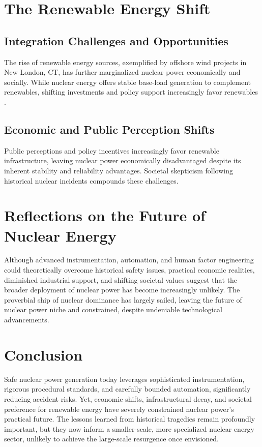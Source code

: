 \documentclass[12pt]{article}
\begin{document}
\section{The Renewable Energy Shift}

\subsection{Integration Challenges and Opportunities}
The rise of renewable energy sources, exemplified by offshore wind projects in New London, CT, has further marginalized nuclear power economically and socially. While nuclear energy offers stable base-load generation to complement renewables, shifting investments and policy support increasingly favor renewables \cite{abdussami2025future}.

\subsection{Economic and Public Perception Shifts}
Public perceptions and policy incentives increasingly favor renewable infrastructure, leaving nuclear power economically disadvantaged despite its inherent stability and reliability advantages. Societal skepticism following historical nuclear incidents compounds these challenges.

\section{Reflections on the Future of Nuclear Energy}
Although advanced instrumentation, automation, and human factor engineering could theoretically overcome historical safety issues, practical economic realities, diminished industrial support, and shifting societal values suggest that the broader deployment of nuclear power has become increasingly unlikely. The proverbial ship of nuclear dominance has largely sailed, leaving the future of nuclear power niche and constrained, despite undeniable technological advancements.

\section{Conclusion}
Safe nuclear power generation today leverages sophisticated instrumentation, rigorous procedural standards, and carefully bounded automation, significantly reducing accident risks. Yet, economic shifts, infrastructural decay, and societal preference for renewable energy have severely constrained nuclear power's practical future. The lessons learned from historical tragedies remain profoundly important, but they now inform a smaller-scale, more specialized nuclear energy sector, unlikely to achieve the large-scale resurgence once envisioned.

\newpage
\printbibliography
\end{document}
